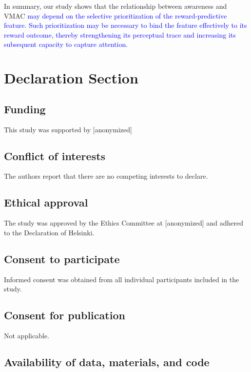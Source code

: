 \documentclass[
  man,
  floatsintext,
  longtable,
  nolmodern,
  notxfonts,
  notimes,
  mask,
  colorlinks=true,linkcolor=blue,citecolor=blue,urlcolor=blue]{apa7}
\begin{document}
In summary, our study shows that the relationship between awareness and
VMAC \textcolor{blue}{may depend on the selective prioritization of the
reward-predictive feature. Such prioritization may be necessary to bind
the feature effectively to its reward outcome, thereby strengthening its
perceptual trace and increasing its subsequent capacity to capture
attention.}

\section{Declaration Section}\label{declaration-section}

\subsection{Funding}\label{funding}

This study was supported by {[}anonymized{]}

\subsection{Conflict of interests}\label{conflict-of-interests}

The authors report that there are no competing interests to declare.

\subsection{Ethical approval}\label{ethical-approval}

The study was approved by the Ethics Committee at {[}anonymized{]} and
adhered to the Declaration of Helsinki.

\subsection{Consent to participate}\label{consent-to-participate}

Informed consent was obtained from all individual participants included
in the study.

\subsection{Consent for publication}\label{consent-for-publication}

Not applicable.

\subsection{Availability of data, materials, and
code}\label{availability-of-data-materials-and-code}
\end{document}
